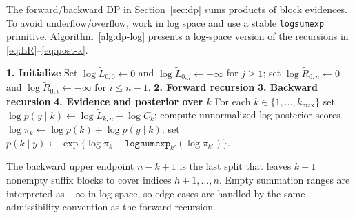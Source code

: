 The forward/backward DP in Section~\ref{sec:dp} sums products of block evidences.
To avoid underflow/overflow, work in log space and use a stable
\texttt{logsumexp} primitive.
Algorithm~\ref{alg:dp-log} presents a log-space version of the recursions in
\eqref{eq:LR}--\eqref{eq:post-k}.

\begin{algorithm}[H]
\caption{DPLog$(\ell^{(0)}_{ij},k_{\max},\log p(k),\log C_k)$}
\label{alg:dp-log}
\KwIn{Log block evidences $\ell^{(0)}_{ij}=\log \widetilde{A}^{(0)}_{ij}$ on the index set $\{0\le i<j\le n\}$ (block $(i,j]$);
maximum segments $k_{\max}$;
log prior on $k$, $\log p(k)$;
log normalizers $\log C_k$ computed under the same admissible-block and length-prior convention as the score array. For the index-uniform fixed-$k$ prior with $g\equiv1$, $C_k=\binom{n-1}{k-1}$ unless the caller has intentionally absorbed a normalized prior into the block or count scores.}
\BlankLine
\textbf{1. Initialize}\;
Set $\log \widetilde{L}_{0,0}\leftarrow 0$ and $\log \widetilde{L}_{0,j}\leftarrow -\infty$ for $j\ge 1$;
set $\log \widetilde{R}_{0,n}\leftarrow 0$ and $\log \widetilde{R}_{0,i}\leftarrow -\infty$ for $i\le n-1$.
\BlankLine
\textbf{2. Forward recursion}\;
\BlankLine
\textbf{3. Backward recursion}\;
\BlankLine
\textbf{4. Evidence and posterior over $k$}\;
For each $k\in\{1,\dots,k_{\max}\}$ set
$\log p(y\mid k)\leftarrow \log \widetilde{L}_{k,n} - \log C_k$;
compute unnormalized log posterior scores
$\log \pi_k \leftarrow \log p(k) + \log p(y\mid k)$;
set $p(k\mid y)\leftarrow \exp\{\log \pi_k - \texttt{logsumexp}_{k'}(\log \pi_{k'})\}$.
\end{algorithm}

The backward upper endpoint $n-k+1$ is the last split that leaves $k-1$ nonempty suffix blocks to
cover indices $h+1,\dots,n$. Empty summation ranges are interpreted as $-\infty$ in log space, so
edge cases are handled by the same admissibility convention as the forward recursion.

